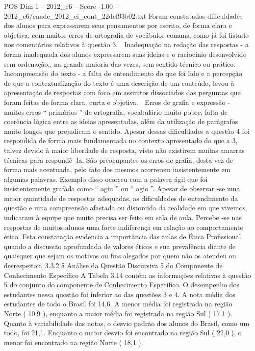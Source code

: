 \begin{textsample}{POS Dim 1 – 2012\_c6 – Score -1.00 – 2012\_c6/enade\_2012\_ci\_cont\_22dcf93b02.txt}
Foram constatadas dificuldades dos alunos para expressarem seus pensamentos por escrito, de forma clara e objetiva, com muitos erros de ortografia de vocábulos comuns, como já foi listado nos comentários relativos à questão 3.  Inadequação na redação das respostas - a forma inadequada dos alunos expressarem suas ideias e o raciocínio desenvolvido sem ordenação,, na grande maioria das vezes, sem sentido técnico ou prático.  Incompreensão do texto - a falta de entendimento do que foi lido e a percepção de que a contextualização do texto é uma descrição de um conteúdo, levou à apresentação de respostas com foco em assuntos dissociados das perguntas que foram feitas de forma clara, curta e objetiva.  Erros de grafia e expressão - muitos erros “ primários ” de ortografia, vocabulário muito pobre, falta de coerência lógica entre as ideias apresentadas, além da utilização de parágrafos muito longos que prejudicam o sentido.
Apesar dessas dificuldades a questão 4 foi respondida de forma mais fundamentada no contexto apresentado do que a 3, talvez devido à maior liberdade de resposta, visto não existirem muitas amarras técnicas para respondê -la.
São preocupantes os erros de grafia, desta vez de forma mais acentuada, pelo fato dos mesmos ocorrerem insistentemente em algumas palavras.
Exemplo disso ocorreu com a palavra ágil que foi insistentemente grafada como “ agiu ” ou “ agio ”.
Apesar de observar -se uma maior quantidade de respostas adequadas, as dificuldades de entendimento da questão e uma compreensão afastada ou distorcida da realidade em que vivemos, indicaram à equipe que muito precisa ser feito em sala de aula.
Percebe -se nas respostas de muitos alunos uma forte indiferença em relação ao comportamento ético.
Esta constatação evidencia a importância das aulas de Ética Profissional, quando a discussão aprofundada de valores éticos e sua prevalência diante de quaisquer que sejam os motivos ou fins alegados por quem não os atendeu ou desrespeitou. 3.3.2.5 Análise da Questão Discursiva 5 do Componente de Conhecimento Específico A Tabela 3.14 contém as informações relativas à questão 5 do conjunto do componente de Conhecimento Específico.
O desempenho dos estudantes nessa questão foi inferior ao das questões 3 e 4.
A nota média dos estudantes de todo o Brasil foi 14,6.
A menor média foi registrada na região Norte ( 10,9 ), enquanto a maior média foi registrada na região Sul ( 17,1 ).
Quanto à variabilidade das notas, o desvio padrão dos alunos do Brasil, como um todo, foi 21,1.
Enquanto o maior desvio foi encontrado na região Sul ( 22,0 ), o menor foi encontrado na região Norte ( 18,1 ).

\end{textsample}
